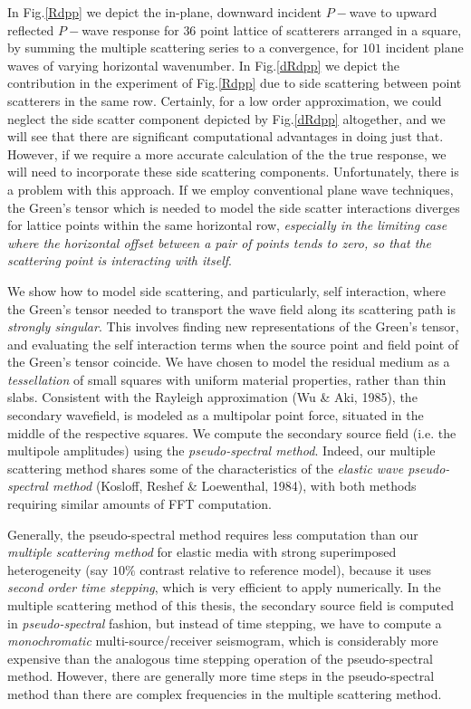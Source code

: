 In Fig.\ref{Rdpp} we depict the in-plane, downward incident $P-$wave to 
upward reflected $P-$wave response for $36$ point lattice of scatterers arranged in a square, 
by summing the multiple scattering series to a convergence, for $101$ 
incident plane waves of varying horizontal wavenumber. In Fig.\ref{dRdpp} 
we depict the contribution in the experiment of Fig.\ref{Rdpp} due to 
side scattering between point scatterers in the same row. Certainly, for a 
low order approximation, we could neglect the side scatter component 
depicted by Fig.\ref{dRdpp}
altogether, and we will see that there are significant computational 
advantages  in doing just that. However, if we require a more accurate 
calculation of the the true response, we will need to incorporate these 
side scattering components.  Unfortunately, there 
is a problem with this approach. 
If we employ conventional plane wave techniques, the 
Green's tensor which is needed to model the side scatter interactions 
diverges for lattice points within the same horizontal row, 
{\em especially in the limiting case where the horizontal offset between 
a pair of points tends to zero, so that the scattering point is interacting with itself\/}.

We show how to model side scattering, and particularly, 
self interaction, where the Green's tensor needed to transport the wave 
field along its scattering path is {\em strongly singular\/}. This 
involves finding new representations of the Green's tensor, and 
evaluating the self interaction terms when the source point and field 
point of the Green's tensor coincide. We have chosen to 
model the residual medium as a {\em tessellation\/} of small squares with 
uniform material properties, rather than thin slabs. Consistent with the 
Rayleigh approximation (Wu \& Aki, 1985),   the secondary wavefield, 
is modeled as a multipolar point force, situated in 
the middle of the respective squares.  We compute the secondary source 
field (i.e. the multipole amplitudes) using the {\em pseudo-spectral method\/}.
Indeed, our multiple scattering method shares some of the characteristics 
of the {\em elastic wave pseudo-spectral method\/} ({Kosloff, Reshef \& 
Loewenthal}, 1984), with both methods requiring similar amounts of FFT 
computation. 

Generally, the  pseudo-spectral method requires less 
computation than our {\em multiple scattering method\/} for elastic media with strong superimposed 
heterogeneity (say $10 \%$ contrast relative to reference model), because 
it uses {\em second order time stepping\/}, which is very efficient to 
apply numerically. In the multiple scattering method of this thesis, 
the secondary source field is computed in {\em pseudo-spectral\/} fashion, 
but instead of time stepping, we have to compute a {\em monochromatic\/} 
multi-source/receiver seismogram, which is considerably more expensive 
than the analogous time stepping operation of the pseudo-spectral method.
However, there are generally more time steps in the pseudo-spectral 
method than there are complex frequencies in the multiple scattering 
method.
 


